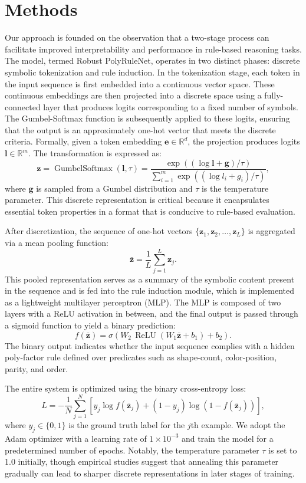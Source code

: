 \documentclass[11pt]{article}
\begin{document}
\section{Methods}
Our approach is founded on the observation that a two-stage process can facilitate improved interpretability and performance in rule-based reasoning tasks. The model, termed Robust PolyRuleNet, operates in two distinct phases: discrete symbolic tokenization and rule induction. In the tokenization stage, each token in the input sequence is first embedded into a continuous vector space. These continuous embeddings are then projected into a discrete space using a fully-connected layer that produces logits corresponding to a fixed number of symbols. The Gumbel-Softmax function is subsequently applied to these logits, ensuring that the output is an approximately one-hot vector that meets the discrete criteria. Formally, given a token embedding \(\mathbf{e} \in \mathbb{R}^{d}\), the projection produces logits \(\mathbf{l} \in \mathbb{R}^{m}\). The transformation is expressed as:
\[
\mathbf{z} = \operatorname{GumbelSoftmax}(\mathbf{l}, \tau) = \frac{\exp\left((\log \mathbf{l} + \mathbf{g})/\tau\right)}{\sum_{i=1}^{m} \exp\left((\log l_i + g_i)/\tau\right)},
\]
where \(\mathbf{g}\) is sampled from a Gumbel distribution and \(\tau\) is the temperature parameter. This discrete representation is critical because it encapsulates essential token properties in a format that is conducive to rule-based evaluation.

After discretization, the sequence of one-hot vectors \(\{\mathbf{z}_1, \mathbf{z}_2, \ldots, \mathbf{z}_L\}\) is aggregated via a mean pooling function:
\[
\bar{\mathbf{z}} = \frac{1}{L} \sum_{j=1}^{L} \mathbf{z}_j.
\]
This pooled representation serves as a summary of the symbolic content present in the sequence and is fed into the rule induction module, which is implemented as a lightweight multilayer perceptron (MLP). The MLP is composed of two layers with a ReLU activation in between, and the final output is passed through a sigmoid function to yield a binary prediction:
\[
f(\bar{\mathbf{z}}) = \sigma\left(W_2\,\operatorname{ReLU}\left(W_1\bar{\mathbf{z}} + b_1\right) + b_2\right).
\]
The binary output indicates whether the input sequence complies with a hidden poly-factor rule defined over predicates such as shape-count, color-position, parity, and order.

The entire system is optimized using the binary cross-entropy loss:
\[
L = -\frac{1}{N}\sum_{j=1}^{N}\left[ y_j \log f(\bar{\mathbf{z}}_j) + (1-y_j) \log \left(1-f(\bar{\mathbf{z}}_j)\right)\right],
\]
where \(y_j \in \{0,1\}\) is the ground truth label for the \(j\)th example. We adopt the Adam optimizer with a learning rate of \(1 \times 10^{-3}\) and train the model for a predetermined number of epochs. Notably, the temperature parameter \(\tau\) is set to 1.0 initially, though empirical studies suggest that annealing this parameter gradually can lead to sharper discrete representations in later stages of training.
\end{document}
